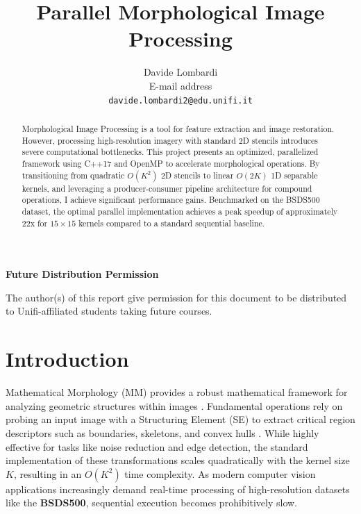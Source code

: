 \documentclass[10pt,twocolumn,letterpaper]{article}
\begin{document}
\title{Parallel Morphological Image Processing}

\author{Davide Lombardi\\
E-mail address\\
{\tt\small davide.lombardi2@edu.unifi.it}
}
\maketitle
\thispagestyle{empty}

\begin{abstract}
Morphological Image Processing is a tool for feature extraction and image restoration. However, processing high-resolution imagery with standard 2D stencils introduces severe computational bottlenecks. This project presents an optimized, parallelized framework using C++17 and OpenMP to accelerate morphological operations. By transitioning from quadratic $O(K^2)$ 2D stencils to linear $O(2K)$ 1D separable kernels, and leveraging a producer-consumer pipeline architecture for compound operations, I achieve significant performance gains. Benchmarked on the BSDS500 dataset, the optimal parallel implementation achieves a peak speedup of approximately 22x for $15 \times 15$ kernels compared to a standard sequential baseline.
\end{abstract}

\noindent\large\textbf{Future Distribution Permission}

The author(s) of this report give permission for this document to be distributed to Unifi-affiliated students taking future courses.

\section{Introduction}
Mathematical Morphology (MM) provides a robust mathematical framework for analyzing geometric structures within images \cite{wikipedia_mm, opencv_morph}. Fundamental operations rely on probing an input image with a Structuring Element (SE) to extract critical region descriptors such as boundaries, skeletons, and convex hulls \cite{opencv_morph, ismail_paper}. While highly effective for tasks like noise reduction and edge detection, the standard implementation of these transformations scales quadratically with the kernel size $K$, resulting in an $O(K^2)$ time complexity. As modern computer vision applications increasingly demand real-time processing of high-resolution datasets like the \textbf{BSDS500}, sequential execution becomes prohibitively slow.
\end{document}
